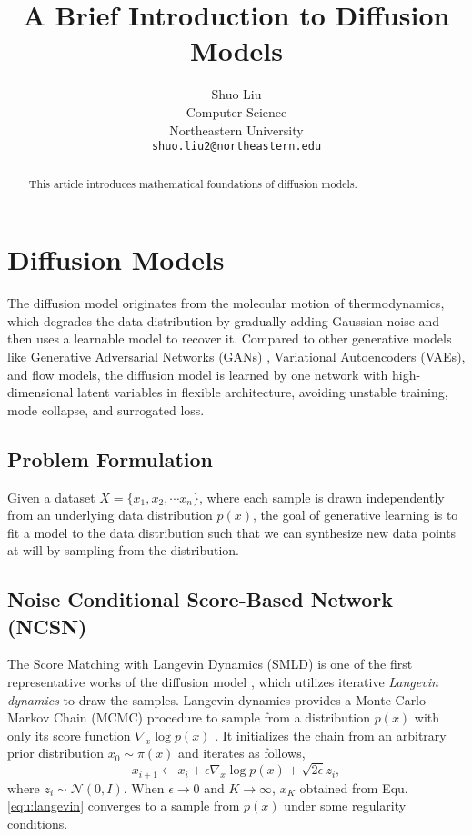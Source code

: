 \documentclass{article} %
\title{A Brief Introduction to Diffusion Models}
\author{Shuo Liu \\
Computer Science\\
Northeastern University\\
\texttt{shuo.liu2@northeastern.edu} \\
}
\begin{document}
\maketitle

\begin{abstract}
This article introduces mathematical foundations of diffusion models.
\end{abstract}

\section{Diffusion Models}

The diffusion model originates from the molecular motion of thermodynamics, which degrades the data distribution by gradually adding Gaussian noise and then uses a learnable model to recover it. Compared to other generative models like Generative Adversarial Networks (GANs) \cite{GAN}, Variational Autoencoders (VAEs), and flow models, the diffusion model is learned by one network with high-dimensional latent variables in flexible architecture, avoiding unstable training, mode collapse, and surrogated loss. 

\subsection{Problem Formulation}

Given a dataset $X=\{x_1, x_2, \cdots x_n\}$, where each sample is drawn independently from an underlying data distribution $p(x)$, the goal of generative learning is to fit a model to the data distribution such that we can synthesize new data points at will by sampling from the distribution.

\subsection{Noise Conditional Score-Based Network (NCSN)}

The Score Matching with Langevin Dynamics (SMLD) is one of the first representative works of the diffusion model \cite{NCSN}, which utilizes iterative \textit{Langevin dynamics} to draw the samples. Langevin dynamics provides a Monte Carlo Markov Chain (MCMC) procedure to sample from a distribution $p(x)$ with only its score function $\nabla_x \log p(x)$ \cite{langevin}. It initializes the chain from an arbitrary prior distribution $x_0\sim \pi(x)$ and iterates as follows,
\begin{equation} \label{equ:langevin}
    x_{i+1} \leftarrow x_i + \epsilon \nabla_x \log p(x) + \sqrt{2 \epsilon} z_i,
\end{equation}
where $z_i \sim \mathcal{N}(0, I)$. When $\epsilon \rightarrow 0$ and $K \rightarrow \infty$, $x_K$ obtained from Equ. \ref{equ:langevin} converges to a sample from $p(x)$ under some regularity conditions.
\end{document}
